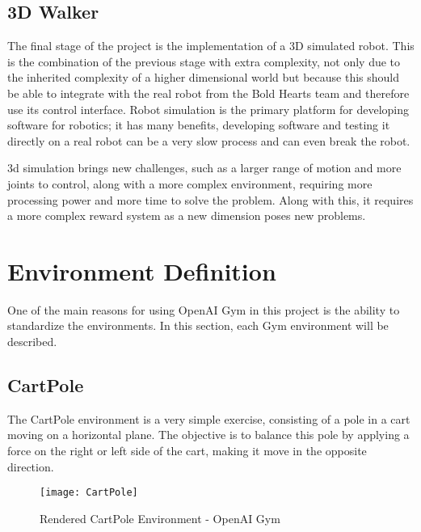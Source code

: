 \subsection{3D Walker}
The final stage of the project is the implementation of a 3D simulated robot. This is the combination of the previous stage with extra complexity, not only due to the inherited complexity of a higher dimensional world but because this should be able to integrate with the real robot from the Bold Hearts team and therefore use its control interface.
Robot simulation is the primary platform for developing software for robotics; it has many benefits, developing software and testing it directly on a real robot can be a very slow process and can even break the robot.

3d simulation brings new challenges, such as a larger range of motion and more joints to control, along with a more complex environment, requiring more processing power and more time to solve the problem. 
Along with this, it requires a more complex reward system as a new dimension poses new problems.

\section{Environment Definition}
One of the main reasons for using OpenAI Gym in this project is the ability to standardize the environments.
In this section, each Gym environment will be described.

\subsection{CartPole}
The CartPole environment is a very simple exercise, consisting of a pole in a cart moving on a horizontal plane. The objective is to balance this pole by applying a force on the right or left side of the cart, making it move in the opposite direction.
\cite{cartpole}

\begin{figure}[H]
 \centering
 \texttt{[image: CartPole]}
 \caption{Rendered CartPole Environment - OpenAI Gym}
\end{figure}

